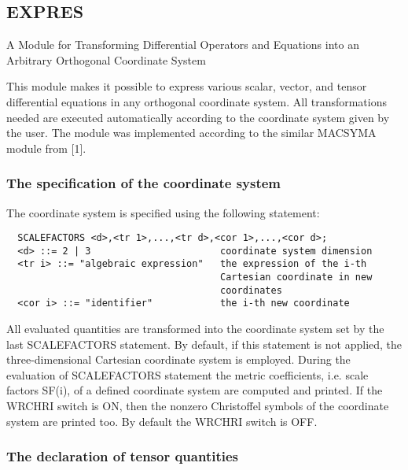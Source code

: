 \subsection{EXPRES}




                A Module for Transforming Differential
         Operators and Equations into an Arbitrary Orthogonal
                           Coordinate System



     This module  makes it  possible to  express various scalar, vector,
and tensor differential equations  in any  orthogonal coordinate system.
All transformations  needed are  executed automatically according to the
coordinate  system  given  by  the  user.  The  module  was  implemented
according to the similar MACSYMA module from [1].


\subsubsection{The specification of the coordinate system}

The coordinate system is specified using the following statement:
\begin{verbatim}
  SCALEFACTORS <d>,<tr 1>,...,<tr d>,<cor 1>,...,<cor d>;
  <d> ::= 2 | 3                       coordinate system dimension
  <tr i> ::= "algebraic expression"   the expression of the i-th
                                      Cartesian coordinate in new
                                      coordinates
  <cor i> ::= "identifier"            the i-th new coordinate
\end{verbatim}
All evaluated  quantities are transformed into the coordinate system set
by the last SCALEFACTORS statement. By default, if this statement is not
applied, the  three-dimensional Cartesian coordinate system is employed.
During the evaluation of SCALEFACTORS statement the metric coefficients,
i.e. scale  factors SF(i),  of a  defined coordinate system are computed
and printed. If the WRCHRI switch  is ON,  then the  nonzero Christoffel
symbols of the coordinate system are printed too. By  default the WRCHRI
switch is OFF.

\subsubsection{The declaration of tensor quantities}

